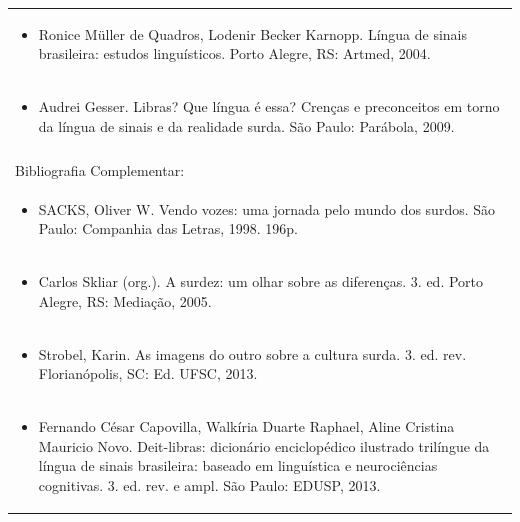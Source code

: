 \documentclass[11pt]{article}
\begin{document}
\begin{center}
\begin{longtable}{|p{4cm}|p{4cm}|p{4cm}|p{4cm}|}
\multicolumn{4}{|p{\dimexpr 16cm + 6\tabcolsep\relax}|}{\begin{itemize}\item Ronice Müller de Quadros, Lodenir Becker Karnopp. Língua de sinais brasileira: estudos linguísticos. Porto Alegre, RS: Artmed, 2004.\end{itemize}}\\
\multicolumn{4}{|p{\dimexpr 16cm + 6\tabcolsep\relax}|}{\begin{itemize}\item Audrei Gesser. Libras? Que língua é essa? Crenças e preconceitos em torno da língua de sinais e da realidade surda. São Paulo: Parábola, 2009.\end{itemize}}\\
\multicolumn{4}{|p{16cm}|}{}\\
\hline
\multicolumn{4}{|p{16cm}|}{Bibliografia Complementar:}\\*
\multicolumn{4}{|p{\dimexpr 16cm + 6\tabcolsep\relax}|}{\begin{itemize}\item SACKS, Oliver W. Vendo vozes: uma jornada pelo mundo dos surdos. São Paulo: Companhia das Letras, 1998. 196p.\end{itemize}}\\
\multicolumn{4}{|p{\dimexpr 16cm + 6\tabcolsep\relax}|}{\begin{itemize}\item Carlos Skliar (org.). A surdez: um olhar sobre as diferenças. 3. ed. Porto Alegre, RS: Mediação, 2005.\end{itemize}}\\
\multicolumn{4}{|p{\dimexpr 16cm + 6\tabcolsep\relax}|}{\begin{itemize}\item Strobel, Karin. As imagens do outro sobre a cultura surda. 3. ed. rev. Florianópolis, SC: Ed. UFSC, 2013.\end{itemize}}\\
\multicolumn{4}{|p{\dimexpr 16cm + 6\tabcolsep\relax}|}{\begin{itemize}\item Fernando César Capovilla, Walkíria Duarte Raphael, Aline Cristina Mauricio Novo. Deit-libras: dicionário enciclopédico ilustrado trilíngue da língua de sinais brasileira: baseado em linguística e neurociências cognitivas. 3. ed. rev. e ampl. São Paulo: EDUSP, 2013.\end{itemize}}\\
\hline
\end{longtable}
\end{center}
\end{document}
